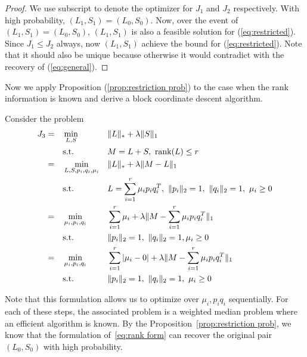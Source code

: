 \begin{proof}
We use subscript to denote the optimizer for $J_{1}$ and $J_{2}$ respectively.
With high probability, $(L_{1},S_{1})=(L_{0},S_{0})$. Now, over the event of $(L_{1},S_{1})=(L_{0},S_{0})$, $(L_{1},S_{1})$ is also a feasible solution for (\ref{eq:restricted}). Since $J_{1}\le J_{2}$ always, now $(L_{1},S_{1})$ achieve the bound for (\ref{eq:restricted}).
Note that it should also be unique because otherwise it would contradict with the recovery of (\ref{eq:general}).
\end{proof}

Now we apply Proposition (\ref{prop:restriction prob}) to the case when the rank information is known and derive a block coordinate descent algorithm.

Consider the problem
\begin{alignat}{3}
J_{3}
&= &&\min_{L, S}  && \|L\|_{*} + \lambda \|S\|_{1} \notag \\
&&&\text{s.t.} && M=L+S, \ \text{rank}(L)\le r \notag \\
&= &&\min_{L, S, p_i, q_i, \mu_i} && \|L\|_{*} + \lambda\| M - L \|_{1} \notag \\
&&& \text{s.t.} && L = \sum_{i=1}^{r} \mu_{i}p_{i}q_{i}^{T}, \  \|p_{i}\|_{2}=1, \ \|q_{i}\|_{2}=1, \ \mu_{i}\ge0 \notag \\
&= && \min_{\mu_{i}, p_{i}, q_{i}} && \sum_{i=1}^{r} \mu_{i} + \lambda \|M - \sum_{i=1}^{r} \mu_{i}p_{i}q_{i}^{T}\|_{1} \notag \\
&&& \text{s.t.} && \|p_{i}\|_{2} = 1, \ \|q_{i}\|_{2} = 1, \mu_{i} \ge 0 \notag \\
& = && \min_{\mu_{i}, p_{i}, q_{i}} && \sum_{i=1}^{r} |\mu_{i}-0| + \lambda \|M - \sum_{i=1}^{r} \mu_{i} p_{i} q_{i}^{T}\|_{1} \label{eq:rank form} \\
&&& \text{s.t.} && \|p_{i}\|_{2} = 1, \ \|q_{i}\|_{2} = 1, \ \mu_{i} \ge 0 \notag
\end{alignat}

Note that this formulation allows us to optimize over $\mu_{i},p_{i}q_{i}$ sequentially. For each of these steps, the associated problem is a weighted median problem where an efficient algorithm is known. By the Proposition~\ref{prop:restriction prob}, we know that the formulation of~\eqref{eq:rank form} can recover the original pair $(L_{0},S_{0})$ with high probability.


